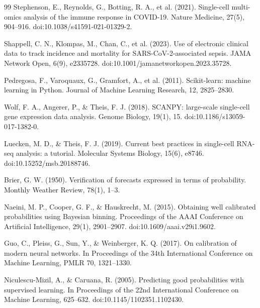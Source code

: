 \documentclass[11pt,a4paper]{article}
\begin{document}
\begin{thebibliography}{99}
Stephenson, E., Reynolds, G., Botting, R. A., et al. (2021).
\newblock Single-cell multi-omics analysis of the immune response in COVID-19.
\newblock Nature Medicine, 27(5), 904--916. doi:10.1038/s41591-021-01329-2.

Shappell, C. N., Klompas, M., Chan, C., et al. (2023).
\newblock Use of electronic clinical data to track incidence and mortality for SARS-CoV-2-associated sepsis.
\newblock JAMA Network Open, 6(9), e2335728. doi:10.1001/jamanetworkopen.2023.35728.

Pedregosa, F., Varoquaux, G., Gramfort, A., et al. (2011).
\newblock Scikit-learn: machine learning in Python.
\newblock Journal of Machine Learning Research, 12, 2825--2830.

Wolf, F. A., Angerer, P., \& Theis, F. J. (2018).
\newblock SCANPY: large-scale single-cell gene expression data analysis.
\newblock Genome Biology, 19(1), 15. doi:10.1186/s13059-017-1382-0.

Luecken, M. D., \& Theis, F. J. (2019).
\newblock Current best practices in single-cell RNA-seq analysis: a tutorial.
\newblock Molecular Systems Biology, 15(6), e8746. doi:10.15252/msb.20188746.

Brier, G. W. (1950).
\newblock Verification of forecasts expressed in terms of probability.
\newblock Monthly Weather Review, 78(1), 1--3.

Naeini, M. P., Cooper, G. F., \& Hauskrecht, M. (2015).
\newblock Obtaining well calibrated probabilities using Bayesian binning.
\newblock Proceedings of the AAAI Conference on Artificial Intelligence, 29(1), 2901--2907. doi:10.1609/aaai.v29i1.9602.

Guo, C., Pleiss, G., Sun, Y., \& Weinberger, K. Q. (2017).
\newblock On calibration of modern neural networks.
\newblock In Proceedings of the 34th International Conference on Machine Learning, PMLR 70, 1321--1330.

Niculescu-Mizil, A., \& Caruana, R. (2005).
\newblock Predicting good probabilities with supervised learning.
\newblock In Proceedings of the 22nd International Conference on Machine Learning, 625--632. doi:10.1145/1102351.1102430.


\end{thebibliography}
\end{document}
